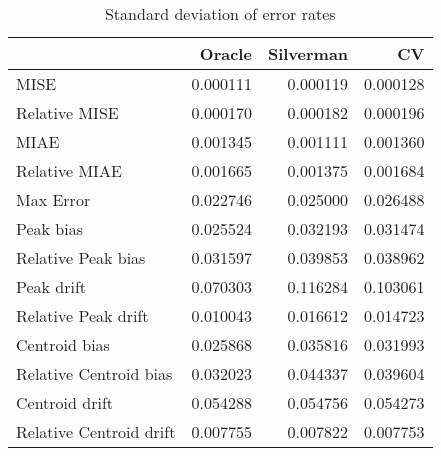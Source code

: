 \begin{table}[H]
\centering
\begin{tabular}{lrrr}
  \hline
 & Oracle & Silverman & CV \\ 
  \hline
MISE & 0.000111 & 0.000119 & 0.000128 \\ 
  Relative MISE & 0.000170 & 0.000182 & 0.000196 \\ 
  MIAE & 0.001345 & 0.001111 & 0.001360 \\ 
  Relative MIAE & 0.001665 & 0.001375 & 0.001684 \\ 
  Max Error & 0.022746 & 0.025000 & 0.026488 \\ 
  Peak bias & 0.025524 & 0.032193 & 0.031474 \\ 
  Relative Peak bias & 0.031597 & 0.039853 & 0.038962 \\ 
  Peak drift & 0.070303 & 0.116284 & 0.103061 \\ 
  Relative Peak drift & 0.010043 & 0.016612 & 0.014723 \\ 
  Centroid bias & 0.025868 & 0.035816 & 0.031993 \\ 
  Relative Centroid bias & 0.032023 & 0.044337 & 0.039604 \\ 
  Centroid drift & 0.054288 & 0.054756 & 0.054273 \\ 
  Relative Centroid drift & 0.007755 & 0.007822 & 0.007753 \\ 
   \hline
\end{tabular}
\caption{Standard deviation of error rates} 
\label{tbl:stddev_error_rates}
\end{table}
